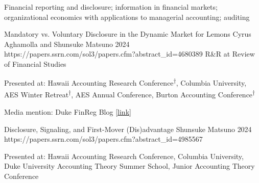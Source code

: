 \newcommand{\co}{\textsuperscript{†}}




\begin{cventries}

\cventryLONG
	{Financial reporting and disclosure; information in financial markets; organizational economics with applications to managerial accounting; auditing}  

\end{cventries}

\vspace{.3cm}

\paperentry
	{Mandatory vs. Voluntary Disclosure in the Dynamic Market for Lemons}   %
	{Cyrus Aghamolla and Shunsuke Matsuno}   %
	{2024}   %
	{https://papers.ssrn.com/sol3/papers.cfm?abstract_id=4680389}  %
	{}   %
	{R\&R at Review of Financial Studies}   %
	{
	\begin{cvitems}  %
		\item {Presented at: Hawaii Accounting Research Conference\co, Columbia University, AES Winter Retreat\co, AES Annual Conference, Burton Accounting Conference\co 
		\hfill\makebox[0pt][r]{\scriptsize(\co  Presented by coauthor)}}			
		\item {Media mention: Duke FinReg Blog \href{https://sites.duke.edu/thefinregblog/2024/10/29/mandatory-vs-voluntary-disclosure-in-the-dynamic-market-for-lemons/}{[link]}}
	\end{cvitems}
	}

\paperentry
	{Disclosure, Signaling, and First-Mover (Dis)advantage}   %
	{Shunsuke Matsuno}   %
	{2024}
	{https://papers.ssrn.com/sol3/papers.cfm?abstract_id=4985567}  %
	{}   %
	{}   %
	{
	\begin{cvitems}  %
		\item {Presented at: Hawaii Accounting Research Conference, Columbia University, Duke University Accounting Theory Summer School, Junior Accounting Theory Conference}
	\end{cvitems}
	}

